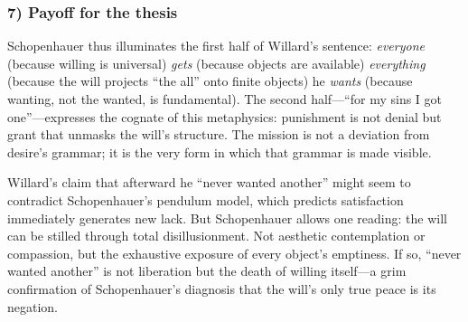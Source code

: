 \subsubsection*{7) Payoff for the thesis}

Schopenhauer thus illuminates the first half of Willard's sentence: \emph{everyone} (because
willing is universal) \emph{gets} (because objects are available) \emph{everything} (because
the will projects ``the all'' onto finite objects) he \emph{wants} (because wanting, not the
wanted, is fundamental). The second half—``for my sins I got one''—expresses the cognate of this
metaphysics: punishment is not denial but grant that unmasks the will's structure. The mission
is not a deviation from desire's grammar; it is the very form in which that grammar is made
visible.

Willard's claim that afterward he ``never wanted another'' might seem to contradict
Schopenhauer's pendulum model, which predicts satisfaction immediately generates new lack. But
Schopenhauer allows one reading: the will can be stilled through total disillusionment. Not
aesthetic contemplation or compassion, but the exhaustive exposure of every object's
emptiness. If so, ``never wanted another'' is not liberation but the death of willing
itself---a grim confirmation of Schopenhauer's diagnosis that the will's only true peace is
its negation.
